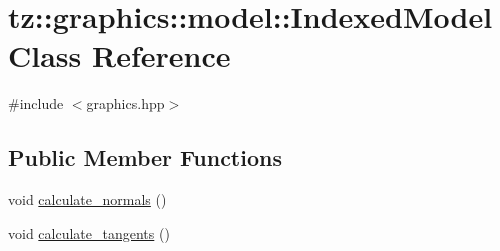 \hypertarget{classtz_1_1graphics_1_1model_1_1_indexed_model}{}\section{tz\+:\+:graphics\+:\+:model\+:\+:Indexed\+Model Class Reference}
\label{classtz_1_1graphics_1_1model_1_1_indexed_model}


{\ttfamily \#include $<$graphics.\+hpp$>$}

\subsection*{Public Member Functions}
\begin{DoxyCompactItemize}
\item 
void \mbox{\hyperlink{classtz_1_1graphics_1_1model_1_1_indexed_model_a019b4f8c72e1e7dd37d2d3ec452cfa3b}{calculate\+\_\+normals}} ()
\item 
void \mbox{\hyperlink{classtz_1_1graphics_1_1model_1_1_indexed_model_ae5dae45074924bcdfbc2adf2ec13f0ec}{calculate\+\_\+tangents}} ()
\end{DoxyCompactItemize}
